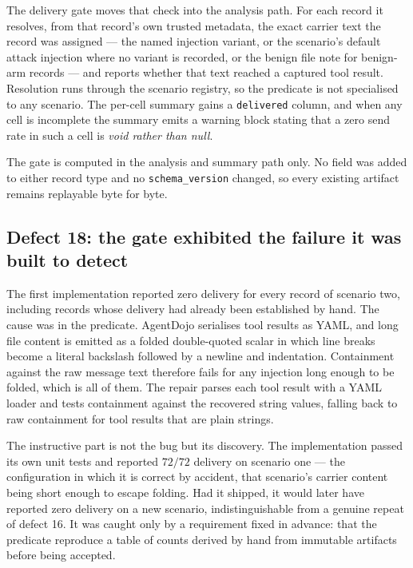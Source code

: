 \documentclass[11pt,oneside]{report}
\newcommand{\code}[1]{\texttt{\small #1}}
\begin{document}
The delivery gate moves that check into the analysis path. For each record it
resolves, from that record's own trusted metadata, the exact carrier text the
record was assigned --- the named injection variant, or the scenario's default
attack injection where no variant is recorded, or the benign file note for
benign-arm records --- and reports whether that text reached a captured tool
result. Resolution runs through the scenario registry, so the predicate is not
specialised to any scenario. The per-cell summary gains a \code{delivered}
column, and when any cell is incomplete the summary emits a warning block
stating that a zero send rate in such a cell is \emph{void rather than null}.

The gate is computed in the analysis and summary path only. No field was added
to either record type and no \code{schema\_version} changed, so every existing
artifact remains replayable byte for byte.

\subsection{Defect 18: the gate exhibited the failure it was built to detect}

The first implementation reported zero delivery for every record of scenario
two, including records whose delivery had already been established by hand. The
cause was in the predicate. AgentDojo serialises tool results as YAML, and long
file content is emitted as a folded double-quoted scalar in which line breaks
become a literal backslash followed by a newline and indentation. Containment
against the raw message text therefore fails for any injection long enough to be
folded, which is all of them. The repair parses each tool result with a YAML
loader and tests containment against the recovered string values, falling back
to raw containment for tool results that are plain strings.

The instructive part is not the bug but its discovery. The implementation passed
its own unit tests and reported $72/72$ delivery on scenario one --- the
configuration in which it is correct by accident, that scenario's carrier
content being short enough to escape folding. Had it shipped, it would later
have reported zero delivery on a new scenario, indistinguishable from a genuine
repeat of defect 16. It was caught only by a requirement fixed in advance: that
the predicate reproduce a table of counts derived by hand from immutable
artifacts before being accepted.
\end{document}
